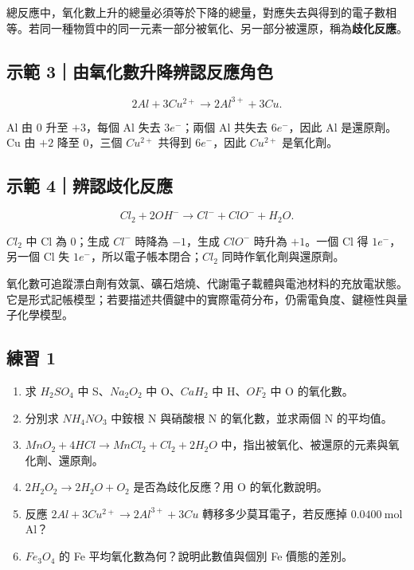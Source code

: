 \documentclass[11pt,a4paper]{article}
\providecommand{\tightlist}{%
  \setlength{\itemsep}{0pt}\setlength{\parskip}{0pt}}
\begin{document}
總反應中，氧化數上升的總量必須等於下降的總量，對應失去與得到的電子數相等。若同一種物質中的同一元素一部分被氧化、另一部分被還原，稱為\textbf{歧化反應}。

\begin{HandoutWorkedExample}

\subsection{示範 3｜由氧化數升降辨認反應角色}\label{ux793aux7bc4-3ux7531ux6c27ux5316ux6578ux5347ux964dux8fa8ux8a8dux53cdux61c9ux89d2ux8272}

\[
2Al+3Cu^{2+}\rightarrow2Al^{3+}+3Cu.
\]

Al 由 \(0\) 升至 \(+3\)，每個 Al 失去 \(3e^-\)；兩個 Al 共失去 \(6e^-\)，因此 Al 是還原劑。Cu 由 \(+2\) 降至 \(0\)，三個 \(Cu^{2+}\) 共得到 \(6e^-\)，因此 \(Cu^{2+}\) 是氧化劑。

\end{HandoutWorkedExample}

\begin{HandoutWorkedExample}

\subsection{示範 4｜辨認歧化反應}\label{ux793aux7bc4-4ux8fa8ux8a8dux6b67ux5316ux53cdux61c9}

\[
Cl_2+2OH^-\rightarrow Cl^-+ClO^-+H_2O.
\]

\(Cl_2\) 中 Cl 為 \(0\)；生成 \(Cl^-\) 時降為 \(-1\)，生成 \(ClO^-\) 時升為 \(+1\)。一個 Cl 得 \(1e^-\)，另一個 Cl 失 \(1e^-\)，所以電子帳本閉合；\(Cl_2\) 同時作氧化劑與還原劑。

\end{HandoutWorkedExample}

氧化數可追蹤漂白劑有效氯、礦石焙燒、代謝電子載體與電池材料的充放電狀態。它是形式記帳模型；若要描述共價鍵中的實際電荷分布，仍需電負度、鍵極性與量子化學模型。

\subsection{練習 1}\label{ux7df4ux7fd2-1}

\begin{enumerate}
\def\labelenumi{\arabic{enumi}.}
\tightlist
\item
  求 \(H_2SO_4\) 中 S、\(Na_2O_2\) 中 O、\(CaH_2\) 中 H、\(OF_2\) 中 O 的氧化數。
\item
  分別求 \(NH_4NO_3\) 中銨根 N 與硝酸根 N 的氧化數，並求兩個 N 的平均值。
\item
  \(MnO_2+4HCl\rightarrow MnCl_2+Cl_2+2H_2O\) 中，指出被氧化、被還原的元素與氧化劑、還原劑。
\item
  \(2H_2O_2\rightarrow2H_2O+O_2\) 是否為歧化反應？用 O 的氧化數說明。
\item
  反應 \(2Al+3Cu^{2+}\rightarrow2Al^{3+}+3Cu\) 轉移多少莫耳電子，若反應掉 \(0.0400\ \mathrm{mol}\) Al？
\item
  \(Fe_3O_4\) 的 Fe 平均氧化數為何？說明此數值與個別 Fe 價態的差別。
\end{enumerate}
\end{document}
